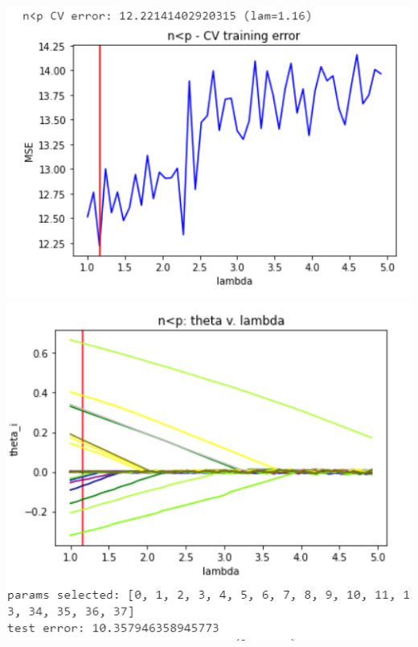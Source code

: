\documentclass[11pt]{article}
\begin{document}
\begin{center}
\includegraphics[scale=0.7]{charts/bgd_ortho_n_lt_p_err.PNG}
\includegraphics[scale=0.7]{charts/bgd_ortho_n_lt_p_thetas.PNG}


\end{center}
\end{document}
